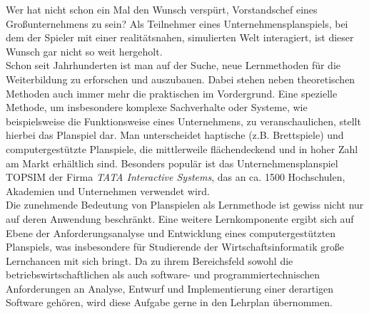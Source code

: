 Wer hat nicht schon ein Mal den Wunsch verspürt, Vorstandschef eines Großunternehmens zu sein? 
Als Teilnehmer eines Unternehmensplanspiels, bei dem der Spieler mit  einer realitätsnahen, simulierten Welt interagiert, ist dieser Wunsch gar nicht so weit hergeholt. 
\\
Schon seit Jahrhunderten ist man auf der Suche, neue Lernmethoden für die Weiterbildung zu erforschen und auszubauen. Dabei stehen neben theoretischen Methoden auch immer mehr die praktischen im Vordergrund.  Eine spezielle Methode, um insbesondere komplexe Sachverhalte oder Systeme, wie beispielsweise die Funktionsweise eines Unternehmens, zu veranschaulichen, stellt hierbei das Planspiel dar. Man unterscheidet haptische (z.B. Brettspiele) und computergestützte Planspiele, die mittlerweile flächendeckend und in hoher Zahl am Markt erhältlich sind. Besonders populär ist das Unternehmensplanspiel TOPSIM der Firma \textit{TATA Interactive Systems}, das an ca. 1500 Hochschulen, Akademien und Unternehmen verwendet wird. 
\\
Die zunehmende Bedeutung von Planspielen als Lernmethode ist gewiss nicht nur auf deren Anwendung beschränkt. Eine weitere Lernkomponente ergibt sich auf Ebene der Anforderungsanalyse und Entwicklung eines computergestützten Planspiels, was insbesondere für Studierende der Wirtschaftsinformatik große Lernchancen mit sich bringt. Da zu ihrem Bereichsfeld sowohl die betriebswirtschaftlichen als auch software- und programmiertechnischen Anforderungen an Analyse, Entwurf und Implementierung einer derartigen Software gehören, wird diese Aufgabe gerne in den Lehrplan übernommen. 
